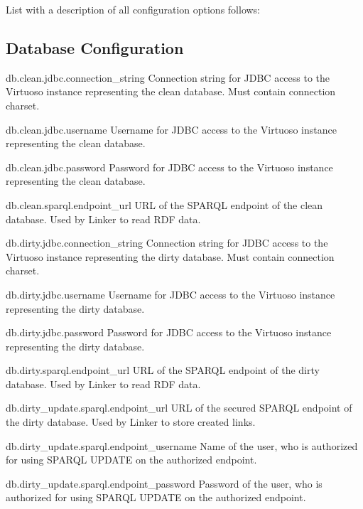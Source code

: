 List with a description of all configuration options follows:

\subsection*{Database Configuration}
\begin{configlist}
	\item[db.clean.jdbc.connection\_string]
	  Connection string for JDBC access to the Virtuoso instance representing the clean database. Must contain connection charset.
	\item[db.clean.jdbc.username]
	  Username for JDBC access to the Virtuoso instance representing the clean database.
	\item[db.clean.jdbc.password]
	  Password for JDBC access to the Virtuoso instance representing the clean database.
	\item[db.clean.sparql.endpoint\_url]
	  URL of the SPARQL endpoint of the clean database. Used by Linker to read RDF data.

	\item[db.dirty.jdbc.connection\_string]
		Connection string for JDBC access to the Virtuoso instance representing the dirty database. Must contain connection charset.
	\item[db.dirty.jdbc.username]
		Username for JDBC access to the Virtuoso instance representing the dirty database.
	\item[db.dirty.jdbc.password]
		Password for JDBC access to the Virtuoso instance representing the dirty database.
		
	\item[db.dirty.sparql.endpoint\_url]
		URL of the SPARQL endpoint of the dirty database. Used by Linker to read RDF data.
	\item[db.dirty\_update.sparql.endpoint\_url]
		URL of the secured SPARQL endpoint of the dirty database. Used by Linker to store created links.
	\item[db.dirty\_update.sparql.endpoint\_username]
		Name of the user, who is authorized for using SPARQL UPDATE on the authorized endpoint.
	\item[db.dirty\_update.sparql.endpoint\_password]
		Password of the user, who is authorized for using SPARQL UPDATE on the authorized endpoint.
\end{configlist}

